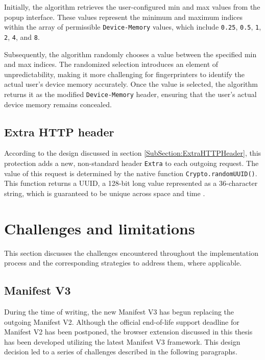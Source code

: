 Initially, the algorithm retrieves the user-configured min and max values from the popup interface. These values represent the minimum and maximum indices within the array of permissible \texttt{Device-Memory} values, which include \texttt{0.25}, \texttt{0.5}, \texttt{1}, \texttt{2}, \texttt{4}, and \texttt{8}.

Subsequently, the algorithm randomly chooses a value between the specified min and max indices. The randomized selection introduces an element of unpredictability, making it more challenging for fingerprinters to identify the actual user's device memory accurately. Once the value is selected, the algorithm returns it as the modified \texttt{Device-Memory} header, ensuring that the user's actual device memory remains concealed.

\subsection{Extra HTTP header}

According to the design discussed in section \ref{SubSection:ExtraHTTPHeader}, this protection adds a new, non-standard header \texttt{Extra} to each outgoing request. The value of this request is determined by the native function \texttt{Crypto.randomUUID()}. This function returns a UUID, a 128-bit long value represented as a 36-character string, which is guaranteed to be unique across space and time \cite{RFC4122}.

\section{Challenges and limitations}

This section discusses the challenges encountered throughout the implementation process and the corresponding strategies to address them, where applicable.

\subsection{Manifest V3}

During the time of writing, the new Manifest V3 has begun replacing the outgoing Manifest V2. Although the official end-of-life support deadline for Manifest V2 has been postponed, the browser extension discussed in this thesis has been developed utilizing the latest Manifest V3 framework. This design decision led to a series of challenges described in the following paragraphs.

